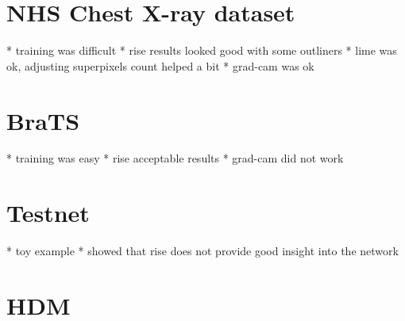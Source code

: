 \section{NHS Chest X-ray dataset}
* training was difficult
* rise results looked good with some outliners
* lime was ok, adjusting superpixels count helped a bit 
* grad-cam was ok

\section{BraTS}
* training was easy
* rise acceptable results
* grad-cam did not work

\section{Testnet}
* toy example
* showed that rise does not provide good insight into the network

\section{HDM}
